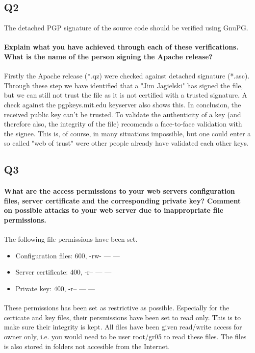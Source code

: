 \documentclass[a4paper,11pt]{article}
\begin{document}
\subsection{Q2}
The detached PGP signature of the source code should be verified using GnuPG.
\paragraph{Explain what you have achieved through each of these veriﬁcations. What is the name of the person signing the Apache release?}
\paragraph{}Firstly the Apache release (*.qz) were checked against detached signature (*.asc). Through these step we have identified that a "Jim Jagielski" has signed the file, but we can still not trust the file as it is not certified with a trusted signature. A check against the pgpkeys.mit.edu keyserver also shows this. In conclusion, the received public key can't be trusted. To validate the authenticity of a key (and therefore also, the integrity of the file) \cite{4} recomends a face-to-face validation with the signee. This is, of course, in many situations impossible, but one could enter a so called "web of trust" were other people already have validated each other keys.  
\subsection{Q3}
\paragraph{What are the access permissions to your web servers conﬁguration files, server certiﬁcate and the corresponding private key? Comment on possible attacks to your web server due to inappropriate file permissions.}
\paragraph{}The following file permissions have been set.
\begin{itemize}
	\item Configuration files: 600, -rw- --- ---
	\item Server certificate: 400, -r-- --- ---
	\item Private key: 400, -r-- --- ---
\end{itemize}
\paragraph{} These permissions has been set as restrictive as possible. Especially for the certicate and key files, their persmissions have been set to read only. This is to make sure their integrity is kept. All files have been given read/write access for owner only, i.e. you would need to be user root/gr05 to read these files. The files is also stored in folders not accesible from the Internet.
\end{document}
